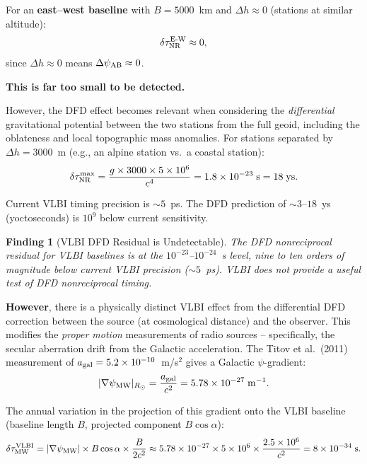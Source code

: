\documentclass[aps,prd,twocolumn,superscriptaddress,nofootinbib]{revtex4-2}
\newtheorem{finding}{Finding}
\begin{document}
For an \textbf{east--west baseline} with $B = 5000$~km and
$\Delta h \approx 0$ (stations at similar altitude):
\begin{equation}
\delta\tau_{\rm NR}^{\rm E\text{-}W} \approx 0,
\end{equation}
since $\Delta h \approx 0$ means $\Delta\psi_{\rm AB} \approx 0$.

\textbf{This is far too small to be detected.}

However, the DFD effect becomes relevant when considering the
\emph{differential} gravitational potential between the two stations
from the full geoid, including the oblateness and local topographic
mass anomalies. For stations separated by $\Delta h = 3000$~m
(e.g., an alpine station vs.\ a coastal station):
\begin{equation}
\delta\tau_{\rm NR}^{\rm max}
= \frac{g\times3000\times5\times10^6}{c^4}
= 1.8\times10^{-23}\;\text{s} = 18\;\text{ys}.
\end{equation}

Current VLBI timing precision is $\sim 5$~ps. The DFD prediction
of $\sim 3$--$18$~ys (yoctoseconds) is $10^{9}$ below current sensitivity.

\begin{finding}[VLBI DFD Residual is Undetectable]
\label{find:vlbi}
The DFD nonreciprocal residual for VLBI baselines is at the
$10^{-23}$--$10^{-24}$~s level, nine to ten orders of magnitude
below current VLBI precision ($\sim 5$~ps). VLBI does not provide
a useful test of DFD nonreciprocal timing.
\end{finding}

\textbf{However}, there is a physically distinct VLBI effect from
the differential DFD correction between the source
(at cosmological distance) and the observer. This modifies the
\emph{proper motion} measurements of radio sources -- specifically,
the secular aberration drift from the Galactic acceleration. The
Titov et al.~(2011) measurement of $a_{\rm gal} = 5.2\times10^{-10}$~m/s$^2$
gives a Galactic $\psi$-gradient:
\begin{equation}
|\nabla\psi_{\rm MW}|_{R_\odot}
= \frac{a_{\rm gal}}{c^2} = 5.78\times10^{-27}\;\text{m}^{-1}.
\end{equation}

The annual variation in the projection of this gradient onto the
VLBI baseline (baseline length $B$, projected component $B\cos\alpha$):
\begin{equation}
\delta\tau_{\rm MW}^{\rm VLBI}
= |\nabla\psi_{\rm MW}|\times B\cos\alpha\times\frac{B}{2c^2}
\approx 5.78\times10^{-27}\times5\times10^6
\times\frac{2.5\times10^6}{c^2}
= 8\times10^{-34}\;\text{s}.
\end{equation}
\end{document}
